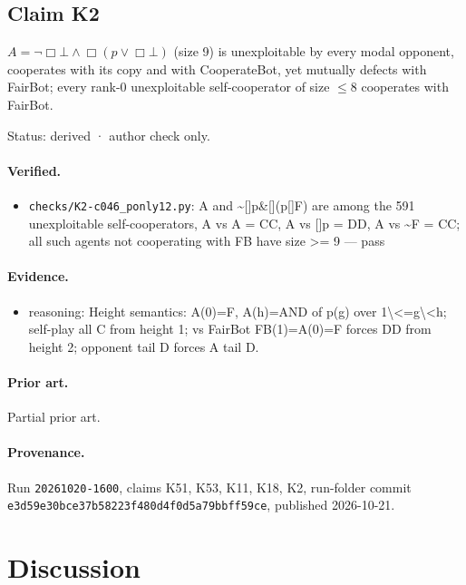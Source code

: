 \documentclass{article}
\begin{document}
\subsection*{Claim K2}

$A=\neg\Box\bot\wedge\Box(p\vee\Box\bot)$ (size 9) is unexploitable by every modal opponent, cooperates with its copy and with CooperateBot, yet mutually defects with FairBot; every rank-0 unexploitable self-cooperator of size $\le 8$ cooperates with FairBot.

Status: derived · author check only.

\paragraph{Verified.}
\begin{itemize}
\item \texttt{checks/K2-c046\_ponly12.py}: A and \textasciitilde{}[]p\&[](p\textbar{}[]F) are among the 591 unexploitable self-cooperators, A vs A = CC, A vs []p = DD, A vs \textasciitilde{}F = CC; all such agents not cooperating with FB have size \textgreater{}= 9 --- pass
\end{itemize}

\paragraph{Evidence.}
\begin{itemize}
\item reasoning: Height semantics: A(0)=F, A(h)=AND of p(g) over 1\textbackslash{}\textless{}=g\textbackslash{}\textless{}h; self-play all C from height 1; vs FairBot FB(1)=A(0)=F forces DD from height 2; opponent tail D forces A tail D.
\end{itemize}

\paragraph{Prior art.} Partial prior art.


\paragraph{Provenance.}
Run \texttt{20261020-1600}, claims K51, K53, K11, K18, K2, run-folder commit \texttt{e3d59e30bce37b58223f480d4f0d5a79bbff59ce}, published 2026-10-21.

\section{Discussion}
\end{document}

